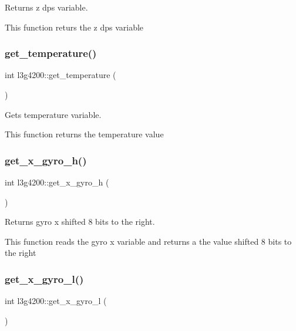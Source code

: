 Returns z dps variable. 

This function returs the z dps variable \mbox{\label{classl3g4200_ad9a37076877d12182d8e259f81fae966}} 
\subsubsection{\texorpdfstring{get\+\_\+temperature()}{get\_temperature()}}
{\footnotesize\ttfamily int l3g4200\+::get\+\_\+temperature (\begin{DoxyParamCaption}{ }\end{DoxyParamCaption})\hspace{0.3cm}{\ttfamily [inline]}}



Gets temperature variable. 

This function returns the temperature value \mbox{\label{classl3g4200_a3afab49f43f0224912363175c1560df4}} 
\subsubsection{\texorpdfstring{get\+\_\+x\+\_\+gyro\+\_\+h()}{get\_x\_gyro\_h()}}
{\footnotesize\ttfamily int l3g4200\+::get\+\_\+x\+\_\+gyro\+\_\+h (\begin{DoxyParamCaption}{ }\end{DoxyParamCaption})\hspace{0.3cm}{\ttfamily [inline]}}



Returns gyro x shifted 8 bits to the right. 

This function reads the gyro x variable and returns a the value shifted 8 bits to the right \mbox{\label{classl3g4200_a34b780b136282aa2fdace5daeaadb7ac}} 
\subsubsection{\texorpdfstring{get\+\_\+x\+\_\+gyro\+\_\+l()}{get\_x\_gyro\_l()}}
{\footnotesize\ttfamily int l3g4200\+::get\+\_\+x\+\_\+gyro\+\_\+l (\begin{DoxyParamCaption}{ }\end{DoxyParamCaption})\hspace{0.3cm}{\ttfamily [inline]}}



